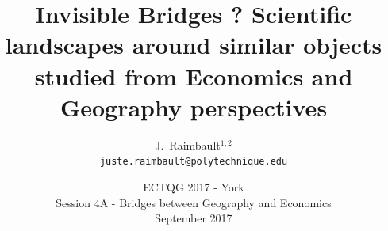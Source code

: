 \documentclass[english,11pt]{beamer}
\begin{document}
\title{Invisible Bridges ? Scientific landscapes around similar objects studied from Economics and Geography perspectives}

\author{J.~Raimbault$^{1,2}$\\
\texttt{juste.raimbault@polytechnique.edu}
}




\date{ECTQG 2017 - York\\\smallskip
Session 4A  - Bridges between Geography and Economics\\\smallskip
September 2017
}

\frame{\maketitle}







\end{document}
